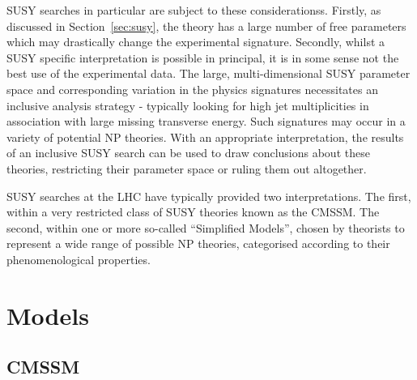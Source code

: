 \ac{SUSY} searches in particular are subject to these
considerationss. Firstly, as discussed in Section~\ref{sec:susy}, the theory
has a large number of free parameters which may drastically change the
experimental signature. Secondly, whilst a \ac{SUSY} specific interpretation is
possible in principal, it is in some sense not the best use of the experimental
data. The large, multi-dimensional \ac{SUSY} parameter space and corresponding
variation in the physics signatures necessitates an inclusive analysis
strategy - typically looking for high jet multiplicities in association with
large missing transverse energy. Such signatures may occur in a variety of
potential \ac{NP} theories. With an appropriate interpretation, the results of
an inclusive \ac{SUSY} search can be used to draw conclusions about these
theories, restricting their parameter space or ruling them out altogether.

\ac{SUSY} searches at the \ac{LHC} have typically provided two
interpretations. The first, within a very restricted class of \ac{SUSY} theories
known as the \ac{CMSSM}. The second, within one or more so-called ``Simplified
Models'', chosen by theorists to represent a wide range of possible \ac{NP}
theories, categorised according to their phenomenological properties.

\section{Models}
\subsection{\acl{CMSSM}}

